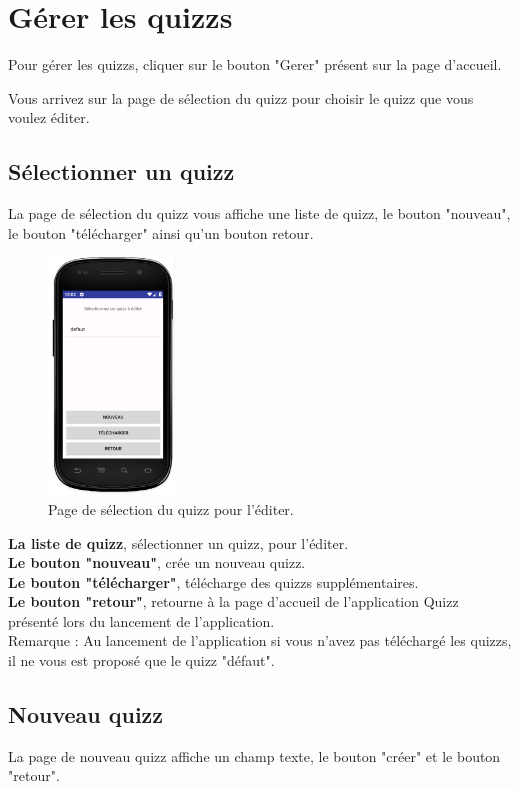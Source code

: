 \documentclass[a4paper]{report}
\begin{document}
\chapter{Gérer les quizzs}
Pour gérer les quizzs, cliquer sur le bouton "Gerer" présent sur la page d'accueil.

Vous arrivez sur la page de sélection du quizz pour choisir le quizz que vous voulez éditer.

\section{Sélectionner un quizz}
La page de sélection du quizz vous affiche une liste de quizz, le bouton "nouveau", le bouton "télécharger" ainsi qu'un bouton retour.

\begin{figure}[h]
\centering
\includegraphics[width=0.3\textwidth]{gererSelectQuizz.png}
\caption{\label{fig:Sélection du quizz pour l'éditer}Page de sélection du quizz pour l'éditer.}
\end{figure}

\textbf{La liste de quizz}, sélectionner un quizz, pour l'éditer.\\
\textbf{Le bouton "nouveau"}, crée un nouveau quizz. \\
\textbf{Le bouton "télécharger"}, télécharge des quizzs supplémentaires. \\
\textbf{Le bouton "retour"}, retourne à la page d'accueil de l'application Quizz présenté lors du lancement de l'application. \\

Remarque : Au lancement de l'application si vous n'avez pas téléchargé les quizzs, il ne vous est proposé que le quizz "défaut".


\newpage
\section{Nouveau quizz}
La page de nouveau quizz affiche un champ texte, le bouton "créer" et le bouton "retour".
\end{document}

